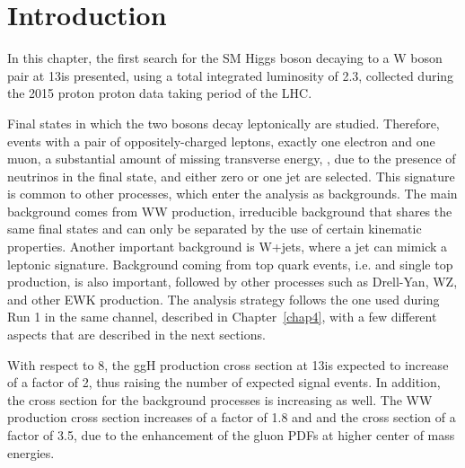 \section{Introduction}\label{sec:chap5_introduction}

In this chapter, the first search for the SM Higgs boson decaying to a W boson pair at 13\TeV is presented, using a total integrated luminosity of 2.3\ifb,
collected during the 2015 proton proton data taking period of the LHC.

Final states in which the two \W bosons decay leptonically are studied.
Therefore, events with a pair of oppositely-charged leptons,
exactly one electron and one muon, a substantial amount of missing transverse energy, \MET, 
due to the presence of neutrinos in the final state, and either zero or one jet are selected. 
This signature is common to other processes, which enter the analysis as backgrounds.
The main background comes from WW production, irreducible background that shares the same final states and can only 
be separated by the use of certain kinematic properties.
Another important background is W+jets, where a jet can mimick a leptonic signature.
Background coming from top quark events, i.e. \ttbar and single top production, is also important, 
followed by other processes such as Drell-Yan, WZ, and other EWK production.
The analysis strategy follows the one used during Run 1 in the same channel, described in Chapter~\ref{chap4}, with a few different aspects that are described in the next sections.

With respect to 8\TeV, the ggH production cross section at 13\TeV is expected to increase of a factor of 2, thus raising the number of expected signal events. In addition, the cross section for the background processes is increasing as well. The WW production cross section increases of a factor of 1.8 and and the \ttbar cross section of a factor of 3.5, due to the enhancement of the gluon PDFs at higher center of mass energies. 
